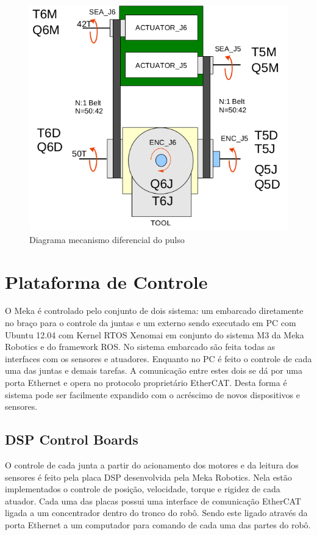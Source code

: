 \begin{figure}[H]
    \centering
    \includegraphics[width = 0.6\linewidth]{tex/figs/meka_wrist.png}
    \caption{Diagrama mecanismo diferencial do pulso \cite{mekartfd}}
    \label{fig:meka-wrist}
\end{figure}


\section{Plataforma de Controle}

O Meka é controlado pelo conjunto de dois sistema: um embarcado diretamente no braço para o controle da juntas e um externo sendo executado em PC com Ubuntu 12.04 com Kernel RTOS Xenomai em conjunto do sistema M3 da Meka Robotics e do framework ROS. No sistema embarcado são feita todas as interfaces com os sensores e atuadores. Enquanto no PC é feito o controle de cada uma das juntas e demais tarefas. A comunicação entre estes dois se dá por uma porta Ethernet e opera no protocolo proprietário EtherCAT. Desta forma é sistema pode ser facilmente expandido com o acréscimo de novos dispositivos e sensores.

\subsection{DSP Control Boards}
O controle de cada junta a partir do acionamento dos motores e da leitura dos sensores é feito pela placa DSP desenvolvida pela Meka Robotics. Nela estão implementados o controle de posição, velocidade, torque e rigidez de cada atuador. Cada uma das placas possui uma interface de comunicação EtherCAT ligada a um concentrador dentro do tronco do robô. Sendo este ligado através da porta Ethernet a um computador para comando de cada uma das partes do robô.

